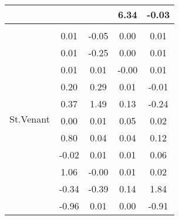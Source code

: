 \begin{table}
\begin{tabular}{c|cc|cc|}
\multicolumn{1}{|c|}{} & \multicolumn{1}{|c|}{} & \multicolumn{1}{|c|}{} & \multicolumn{1}{|c|}{      6.34} & \multicolumn{1}{|c|}{     -0.03} \\ 
\hline 
\multicolumn{1}{|c|}{\multirow{61}{*}{St.Venant}} &\multicolumn{1}{|c|}{} & \multicolumn{1}{|c|}{} & \multicolumn{1}{|c|}{} & \multicolumn{1}{|c|}{} \\ 
\multicolumn{1}{|c|}{} & \multicolumn{1}{|c|}{      0.01} & \multicolumn{1}{|c|}{     -0.05} & \multicolumn{1}{|c|}{      0.00} & \multicolumn{1}{|c|}{      0.01} \\ 
\multicolumn{1}{|c|}{} & \multicolumn{1}{|c|}{      0.01} & \multicolumn{1}{|c|}{     -0.25} & \multicolumn{1}{|c|}{      0.00} & \multicolumn{1}{|c|}{      0.01} \\ 
\multicolumn{1}{|c|}{} & \multicolumn{1}{|c|}{      0.01} & \multicolumn{1}{|c|}{      0.01} & \multicolumn{1}{|c|}{     -0.00} & \multicolumn{1}{|c|}{      0.01} \\ 
\multicolumn{1}{|c|}{} & \multicolumn{1}{|c|}{      0.20} & \multicolumn{1}{|c|}{      0.29} & \multicolumn{1}{|c|}{      0.01} & \multicolumn{1}{|c|}{     -0.01} \\ 
\multicolumn{1}{|c|}{} & \multicolumn{1}{|c|}{      0.37} & \multicolumn{1}{|c|}{      1.49} & \multicolumn{1}{|c|}{      0.13} & \multicolumn{1}{|c|}{     -0.24} \\ 
\multicolumn{1}{|c|}{} & \multicolumn{1}{|c|}{      0.00} & \multicolumn{1}{|c|}{      0.01} & \multicolumn{1}{|c|}{      0.05} & \multicolumn{1}{|c|}{      0.02} \\ 
\multicolumn{1}{|c|}{} & \multicolumn{1}{|c|}{      0.80} & \multicolumn{1}{|c|}{      0.04} & \multicolumn{1}{|c|}{      0.04} & \multicolumn{1}{|c|}{      0.12} \\ 
\multicolumn{1}{|c|}{} & \multicolumn{1}{|c|}{     -0.02} & \multicolumn{1}{|c|}{      0.01} & \multicolumn{1}{|c|}{      0.01} & \multicolumn{1}{|c|}{      0.06} \\ 
\multicolumn{1}{|c|}{} & \multicolumn{1}{|c|}{      1.06} & \multicolumn{1}{|c|}{     -0.00} & \multicolumn{1}{|c|}{      0.01} & \multicolumn{1}{|c|}{      0.02} \\ 
\multicolumn{1}{|c|}{} & \multicolumn{1}{|c|}{     -0.34} & \multicolumn{1}{|c|}{     -0.39} & \multicolumn{1}{|c|}{      0.14} & \multicolumn{1}{|c|}{      1.84} \\ 
\multicolumn{1}{|c|}{} & \multicolumn{1}{|c|}{     -0.96} & \multicolumn{1}{|c|}{      0.01} & \multicolumn{1}{|c|}{      0.00} & \multicolumn{1}{|c|}{     -0.91} \\ 

\end{tabular}
\end{table}
